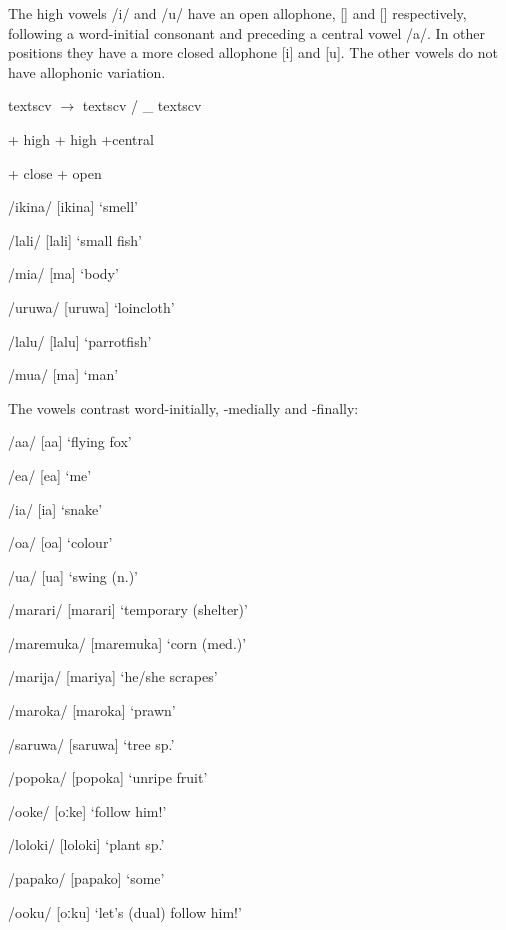 The high vowels /i/ and /u/ have an open allophone, [{\textsci}] and [{\textupsilon}] respectively, following a word-initial consonant and preceding a central vowel /a/. In other positions they have a more closed allophone [i] and [u]. The other vowels do not have allophonic variation.

textsc{v}    $\rightarrow $  textsc{v}  /  \_  textsc{v}

+ high  + high      +central

+ close  + open  

/ikina/  [i{{\textprimstress}kina}]  `smell'

/lali/  [la{{\textprimstress}li}]  `small fish'

/mia/  [m{\textsci{{\textprimstress}}}a]  `body'

/uruwa/  [u{{\textprimstress}ruwa}]  `loincloth'

/lalu/  [la{{\textprimstress}lu}]  `parrotfish'

/mua/  [m{\textupsilon{{\textprimstress}}}a]  `man'

The vowels contrast word-initially, -medially and -finally:

/a{\textphi}a/  [a{{\textprimstress}}{\textphi}a]  `flying fox'

/e{\textphi}a/  [e{{\textprimstress}}{\textphi}a]  `me'

/i{\textphi}a/  [i{{\textprimstress}}{\textphi}a]  `snake'

/o{\textphi}a/  [o{{\textprimstress}}{\textphi}a]  `colour'

/u{\textphi}a/  [u{{\textprimstress}}{\textphi}a]  `swing (n.)'

/marari/  [ma{{\textprimstress}rari}]  `temporary (shelter)'

/maremuka/  [ma{{\textprimstress}remuka}]  `corn (med.)'

/marija/  [ma{{\textprimstress}riya}]  `he/she scrapes'

/maroka/  [ma{{\textprimstress}roka}]  `prawn'

/saruwa/  [sa{{\textprimstress}ruwa}]  `tree sp.'

/popoka/  [po{{\textprimstress}poka}]  `unripe fruit'

/ooke/  [{{\textprimstress}oːke}]  `follow him!'

/loloki/  [lo{{\textprimstress}loki}]  `plant sp.'

/papako/  [pa{{\textprimstress}pako}]  `some'

/ooku/  [{{\textprimstress}oːku}]  `let's (dual) follow him!'

